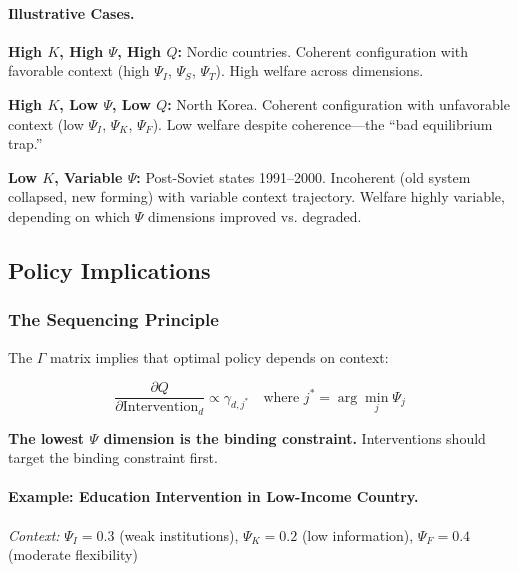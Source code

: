 \paragraph{Illustrative Cases.}

\textbf{High $K$, High $\Psi$, High $Q$:} Nordic countries.
Coherent configuration with favorable context (high $\Psi_I$, $\Psi_S$, $\Psi_T$).
High welfare across dimensions.

\textbf{High $K$, Low $\Psi$, Low $Q$:} North Korea.
Coherent configuration with unfavorable context (low $\Psi_I$, $\Psi_K$, $\Psi_F$).
Low welfare despite coherence---the ``bad equilibrium trap.''

\textbf{Low $K$, Variable $\Psi$:} Post-Soviet states 1991--2000.
Incoherent (old system collapsed, new forming) with variable context trajectory.
Welfare highly variable, depending on which $\Psi$ dimensions improved vs. degraded.

\subsection{Policy Implications}

\subsubsection{The Sequencing Principle}

The $\Gamma$ matrix implies that optimal policy depends on context:

\begin{equation}
  \frac{\partial Q}{\partial \text{Intervention}_d} \propto \gamma_{d,j^*} \quad \text{where } j^* = \arg\min_j \Psi_j
  \label{eq:sequencing}
\end{equation}

\textbf{The lowest $\Psi$ dimension is the binding constraint.}
Interventions should target the binding constraint first.

\paragraph{Example: Education Intervention in Low-Income Country.}

\textit{Context:} $\Psi_I = 0.3$ (weak institutions), $\Psi_K = 0.2$ (low information), $\Psi_F = 0.4$ (moderate flexibility)

